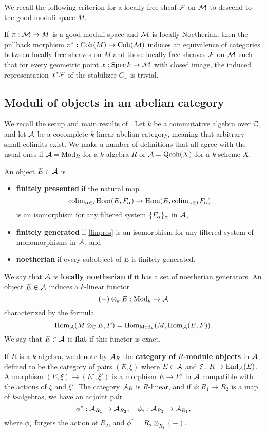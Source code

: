 We recall the following criterion \cite[Theorem 10.3]{AlperGMS} for a locally free sheaf $\mathcal{F}$ on $\mathcal{M}$ to descend to the good moduli space $M$. 
\begin{prop}\label{vbtogms}
    If $\pi: \mathcal{M} \to M$ is a good moduli space and $\mathcal{M}$ is locally Noetherian, then the pullback morphism $\pi^*: \operatorname{\mathrm{Coh}}(M) \to \operatorname{\mathrm{Coh}}(\mathcal{M})$ induces an equivalence of categories between locally free sheaves on $M$ and those locally free sheaves $\mathcal{F}$ on $\mathcal{M}$ such that for every geometric point $x: \operatorname{\mathrm{Spec}} k \to \mathcal{M}$ with closed image, the induced representation $x^*\mathcal{F}$ of the stabilizer $G_x$ is trivial.
\end{prop}

\subsection{Moduli of objects in an abelian category}\label{subsect:moduliabcat}
We recall the setup and main results of \cite[Section 7]{AHLH}. Let $k$ be a commutative algebra over $\mathbb{C}$, and let $\mathcal{A}$ be a cocomplete $k$-linear abelian category, meaning that arbitrary small colimits exist. We make a number of definitions that all agree with the usual ones if $\mathcal{A} = \operatorname{\mathrm{Mod}}_R$ for a $k$-algebra $R$ or $\mathcal{A} = \operatorname{\mathrm{Qcoh}}(X)$ for a $k$-scheme $X$. 

An object $E \in \mathcal{A}$ is
\begin{itemize}
    \item \textbf{finitely presented} if the natural map
    \begin{equation}\label{finpres}
        \mathrm{colim}_{\alpha \in I} \mathrm{Hom}(E, F_\alpha) \to \mathrm{Hom}(E, \mathrm{colim}_{\alpha \in I} F_\alpha)
    \end{equation}
    is an isomorphism for any filtered system $\{F_\alpha\}_\alpha$ in $\mathcal{A}$,
    \item \textbf{finitely generated} if \eqref{finpres}
    is an isomorphism for any filtered system of monomorphisms in $\mathcal{A}$, and
    \item \textbf{noetherian} if every subobject of $E$ is finitely generated.
\end{itemize}
We say that $\mathcal{A}$ is \textbf{locally noetherian} if it has a set of noetherian generators. An object $E \in \mathcal{A}$ induces a $k$-linear functor
\[ (-) \otimes_k E: \operatorname{\mathrm{Mod}}_k \to \mathcal{A} \]
characterized by the formula
\[ \mathrm{Hom}_{\mathcal{A}}(M \otimes_{\mathbb{C}} E, F) = \mathrm{Hom}_{\operatorname{\mathrm{Mod}}_k}(M, \mathrm{Hom}_{\mathcal{A}}(E, F)). \]
We say that $E \in \mathcal{A}$ is \textbf{flat} if this functor is exact. 

If $R$ is a $k$-algebra, we denote by $\mathcal{A}_R$ the \textbf{category of} $R$\textbf{-module objects} in $\mathcal{A}$, defined to be the category of pairs $(E, \xi)$ where $E \in \mathcal{A}$ and $\xi: R \to \operatorname{\mathrm{End}}_{\mathcal{A}}(E)$. A morphism $(E, \xi) \to (E', \xi')$ is a morphism $E \to E'$ in $\mathcal{A}$ compatible with the actions of $\xi$ and $\xi'$. The category $\mathcal{A}_R$ is $R$-linear, and if $\phi: R_1 \to R_2$ is a map of $k$-algebras, we have an adjoint pair
\[ \phi^*: \mathcal{A}_{R_1} \to \mathcal{A}_{R_2}, \quad \phi_*: \mathcal{A}_{R_2} \to \mathcal{A}_{R_1}, \]
where $\phi_*$ forgets the action of $R_2$, and $\phi^* = R_2 \otimes_{R_1} (-)$.

